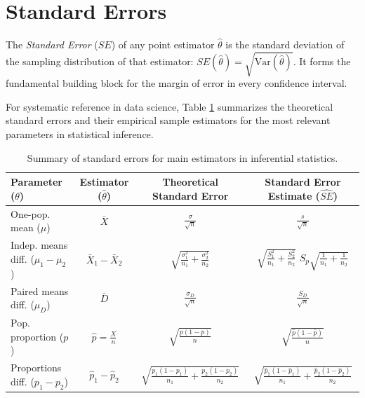 \section{Standard Errors}

The \emph{Standard Error} ($SE$) of any point estimator $\hat{\theta}$ is the standard deviation of the sampling distribution of that estimator: $SE(\hat{\theta}) = \sqrt{\text{Var}(\hat{\theta})}$. It forms the fundamental building block for the margin of error in every confidence interval.

For systematic reference in data science, Table \ref{tab:errores_estandar} summarizes the theoretical standard errors and their empirical sample estimators for the most relevant parameters in statistical inference.

\begin{table}[h!]
	\centering
	\begin{tabular}{lccc}
		\hline
		\textbf{Parameter ($\theta$)} & \textbf{Estimator ($\hat{\theta}$)} & \textbf{Theoretical Standard Error} & \textbf{Standard Error Estimate ($\widehat{SE}$)} \\ \hline
		One-pop. mean ($\mu$) & $\bar{X}$ & $\frac{\sigma}{\sqrt{n}}$ & $\frac{s}{\sqrt{n}}$ \\ [1.5ex]
		Indep. means diff. ($\mu_1 - \mu_2$) & $\bar{X}_1 - \bar{X}_2$ & $\sqrt{\frac{\sigma_1^2}{n_1} + \frac{\sigma_2^2}{n_2}}$ & $\sqrt{\frac{S_1^2}{n_1} + \frac{S_2^2}{n_2}}$ \text{ or } $S_p \sqrt{\frac{1}{n_1} + \frac{1}{n_2}}$ \\ [1.5ex]
		Paired means diff. ($\mu_D$) & $\bar{D}$ & $\frac{\sigma_D}{\sqrt{n}}$ & $\frac{S_D}{\sqrt{n}}$ \\ [1.5ex]
		Pop. proportion ($p$) & $\hat{p} = \frac{X}{n}$ & $\sqrt{\frac{p(1-p)}{n}}$ & $\sqrt{\frac{\hat{p}(1-\hat{p})}{n}}$ \\ [1.5ex]
		Proportions diff. ($p_1 - p_2$) & $\hat{p}_1 - \hat{p}_2$ & $\sqrt{\frac{p_1(1-p_1)}{n_1} + \frac{p_2(1-p_2)}{n_2}}$ & $\sqrt{\frac{\hat{p}_1(1-\hat{p}_1)}{n_1} + \frac{\hat{p}_2(1-\hat{p}_2)}{n_2}}$ \\ \hline
	\end{tabular}
	\caption{Summary of standard errors for main estimators in inferential statistics.}
	\label{tab:errores_estandar}
\end{table}
